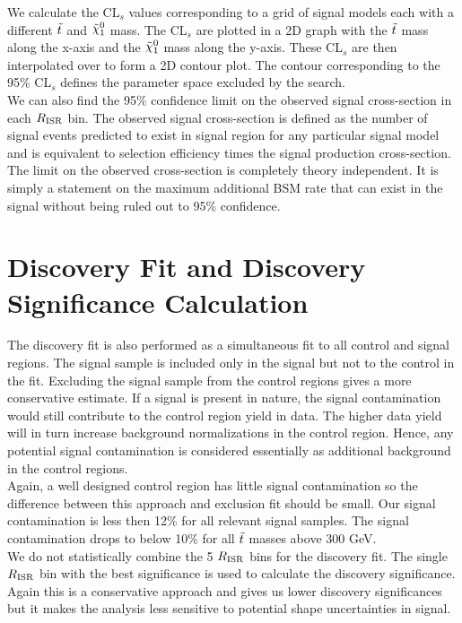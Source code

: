 \indent We calculate the CL$_s$ values corresponding to a grid of signal models each with a different $\tilde{t}$ and $\ninoone$ mass.  The CL$_s$ are plotted in a 2D graph with the $\tilde{t}$ mass along the x-axis and the $\ninoone$ mass along the y-axis.  These CL$_s$ are then interpolated over to form a 2D contour plot.  The contour corresponding to the 95\% CL$_s$ defines the parameter space excluded by the search. \\

\indent We can also find the 95\% confidence limit on the observed signal cross-section in each $R_{\mathrm{ISR}}$ bin.  The observed signal cross-section is defined as the number of signal events predicted to exist in signal region for any particular signal model and is equivalent to selection efficiency times the signal production cross-section.  The limit on the observed cross-section is completely theory independent.  It is simply a statement on the maximum additional BSM rate that can exist in the signal without being ruled out to 95\% confidence.  \\

\section{Discovery Fit and Discovery Significance Calculation}
\label{sec:stat:discovery}

\indent The discovery fit is also performed as a simultaneous fit to all control and signal regions.  The signal sample is included only in the signal but not to the control in the fit.  Excluding the signal sample from the control regions gives a more conservative estimate.  If a signal is present in nature, the signal contamination would still contribute to the control region yield in data.  The higher data yield will in turn increase background normalizations in the control region.  Hence, any potential signal contamination is considered essentially as additional background in the control regions. \\

\indent  Again, a well designed control region has little signal contamination so the difference between this approach and exclusion fit should be small.  Our signal contamination is less then 12\% for all relevant signal samples.  The signal contamination drops to below 10\% for all $\tilde{t}$ masses above 300 GeV.  \\  

\indent We do not statistically combine the 5 $R_{\mathrm{ISR}}$ bins for the discovery fit.  The single $R_{\mathrm{ISR}}$ bin with the best significance is used to calculate the discovery significance.  Again this is a conservative approach and gives us lower discovery significances but it makes the analysis less sensitive to potential shape uncertainties in signal.  \\

